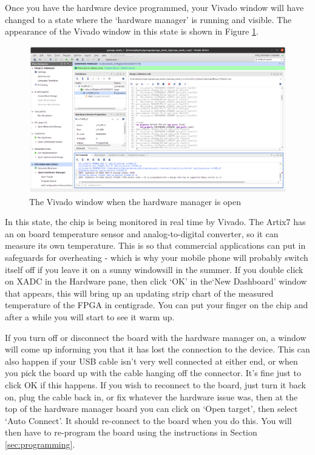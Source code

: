 \documentclass[../physical_computing.tex]{subfiles}
\begin{document}
Once you have the hardware device programmed, your Vivado window will have changed to a state where the `hardware manager' is running and visible. The appearance of the Vivado window in this state is shown in Figure \ref{fig:hardware_manager}. 

\begin{figure}[htbp]
    \centering
    \includegraphics[width=\textwidth]{chapter_1/figures/hardware_manager.png}
    \caption{The Vivado window when the hardware manager is open}
    \label{fig:hardware_manager}
\end{figure}

In this state, the chip is being monitored in real time by Vivado. The Artix7 has an on board temperature sensor and analog-to-digital converter, so it can measure its own temperature. This is so that commercial applications can put in safeguards for overheating - which is why your mobile phone will probably switch itself off if you leave it on a sunny windowsill in the summer. If you double click on XADC in the Hardware pane, then click `OK' in the`New Dashboard' window that appears, this will bring up an updating strip chart of the measured temperature of the FPGA in centigrade. You can put your finger on the chip and after a while you will start to see it warm up. 

If you turn off or disconnect the board with the hardware manager on, a window will come up informing you that it has lost the connection to the device. This can also happen if your USB cable isn't very well connected at either end, or when you pick the board up with the cable hanging off the connector. It's fine just to click OK if this happens. If you wish to reconnect to the board, just turn it back on, plug the cable back in, or fix whatever the hardware issue was, then at the top of the hardware manager board you can click on `Open target', then select `Auto Connect'. It should re-connect to the board when you do this. You will then have to re-program the board using the instructions in Section \ref{sec:programming}. 
\end{document}

